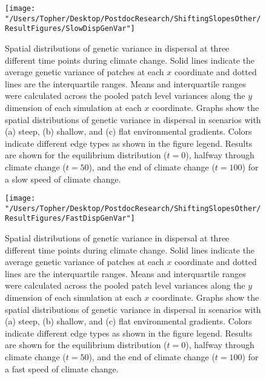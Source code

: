 \documentclass[11pt]{article}
\begin{document}
\begin{figure}[h!]
\texttt{[image: "/Users/Topher/Desktop/PostdocResearch/ShiftingSlopesOther/ResultFigures/SlowDispGenVar"]}
\caption{Spatial distributions of genetic variance in dispersal at three different time points during climate change. Solid lines indicate the average genetic variance of patches at each $x$ coordinate and dotted lines are the interquartile ranges. Means and interquartile ranges were calculated across the pooled patch level variances along the $y$ dimension of each simulation at each $x$ coordinate. Graphs show the spatial distributions of genetic variance in dispersal in scenarios with (a) steep, (b) shallow, and (c) flat environmental gradients. Colors indicate different edge types as shown in the figure legend. Results are shown for the equilibrium distribution ($t = 0$), halfway through climate change ($t = 50$), and the end of climate change ($t = 100$) for a slow speed of climate change.}
\label{Fig:DispGenVarSlow}
\end{figure}

\clearpage

\begin{figure}[h!]
\texttt{[image: "/Users/Topher/Desktop/PostdocResearch/ShiftingSlopesOther/ResultFigures/FastDispGenVar"]}
\caption{Spatial distributions of genetic variance in dispersal at three different time points during climate change. Solid lines indicate the average genetic variance of patches at each $x$ coordinate and dotted lines are the interquartile ranges. Means and interquartile ranges were calculated across the pooled patch level variances along the $y$ dimension of each simulation at each $x$ coordinate. Graphs show the spatial distributions of genetic variance in dispersal in scenarios with (a) steep, (b) shallow, and (c) flat environmental gradients. Colors indicate different edge types as shown in the figure legend. Results are shown for the equilibrium distribution ($t = 0$), halfway through climate change ($t = 50$), and the end of climate change ($t = 100$) for a fast speed of climate change.}
\label{Fig:DispGenVarFast}
\end{figure}

\clearpage
\end{document}
